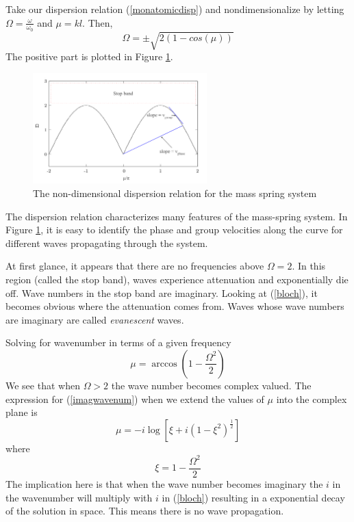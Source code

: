 \documentclass{article}
\begin{document}
Take our dispersion relation (\ref{monatomicdisp}) and nondimensionalize by 
letting $\Omega=\frac{\omega}{\omega_0}$ and $\mu=kl$. Then,
\begin{equation}
\Omega = \pm \sqrt{2(1-cos(\mu))}
\end{equation}
The positive part is plotted in Figure \ref{fig:dr}.
\begin{figure}[!htbp]
	\centering
	\includegraphics[width=0.6\textwidth]{dispersion-rln.pdf}
	\caption{The non-dimensional dispersion relation for the mass spring system}
	\label{fig:dr}
\end{figure}
The dispersion relation characterizes many features of the mass-spring system. 
In Figure \ref{fig:dr}, it is easy to identify the phase and group velocities 
along the curve for different waves propagating through the system. 

At first glance, it appears that there are no frequencies above $\Omega = 2$. 
In this region (called the stop band), waves experience attenuation and 
exponentially die off. Wave numbers in the stop band are imaginary. Looking at 
(\ref{bloch}), it becomes obvious where the attenuation comes from. Waves whose 
wave numbers are imaginary are called \emph{evanescent} waves.

Solving for wavenumber in terms of a given frequency 
\begin{equation} \label{imagwavenum}
\mu = \arccos{\left(1-\frac{\Omega^2}{2}\right)}
\end{equation}
We see that when $\Omega > 2$ the wave number becomes complex valued. The 
expression for (\ref{imagwavenum}) when we extend the values of $\mu$ into the 
complex plane is 
\begin{equation}
		\mu = -i\log \left[ \xi + i(1-\xi^2)^\frac{1}{2} \right]
\end{equation}
where
\begin{equation}
	\xi = 1-\frac{\Omega^2}{2}
\end{equation}
The implication here is that when the wave number becomes imaginary the $i$ in 
the wavenumber will multiply with $i$ in (\ref{bloch}) resulting in a 
exponential decay of the solution in space. This means there is no wave 
propagation.
\end{document}
